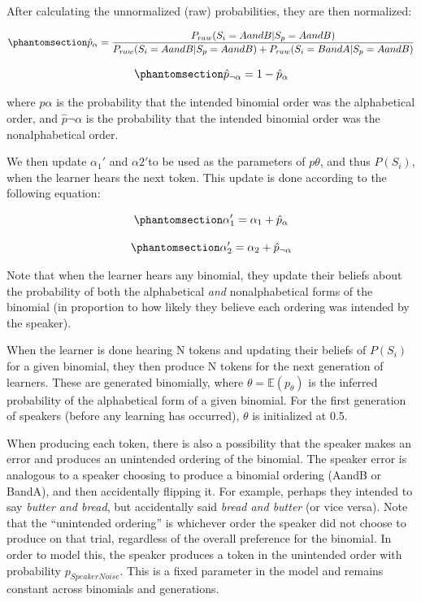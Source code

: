 \documentclass[
  12pt,
  letterpaper,
]{scrreprt}
\begin{document}
After calculating the unnormalized (raw) probabilities, they are then
normalized:

\begin{equation}\phantomsection\label{eq-phatalpha}{
\hat{p}_{\alpha} = \frac{P_{raw}(S_i = AandB|S_p = AandB)}{P_{raw}(S_i = AandB | S_p = AandB) + P_{raw}(S_i = BandA|S_p = AandB)}
}\end{equation}

\begin{equation}\phantomsection\label{eq-phatnotalpha}{
\hat{p}_{\neg\alpha} = 1 - \hat{p}_\alpha
}\end{equation}

\noindent where \(\hat{p}\alpha\) is the probability that the intended
binomial order was the alphabetical order, and \(\hat{p}{\neg\alpha}\)
is the probability that the intended binomial order was the
nonalphabetical order.

We then update \(\alpha_1'\) and \(\alpha2'\)to be used as the
parameters of \(p\theta\), and thus \(P(S_i)\), when the learner hears
the next token. This update is done according to the following equation:

\begin{equation}\phantomsection\label{eq-alpha1prime}{
\alpha_1' = \alpha_1 + \hat{p}_\alpha
}\end{equation}

\begin{equation}\phantomsection\label{eq-alpha2prime}{
\alpha_2' = \alpha_2 + \hat{p}_{\neg\alpha}
}\end{equation}

Note that when the learner hears any binomial, they update their beliefs
about the probability of both the alphabetical \emph{and}
nonalphabetical forms of the binomial (in proportion to how likely they
believe each ordering was intended by the speaker).

When the learner is done hearing N tokens and updating their beliefs of
\(P(S_i)\) for a given binomial, they then produce N tokens for the next
generation of learners. These are generated binomially, where
\(\theta = \mathbb{E}(p_\theta)\) is the inferred probability of the
alphabetical form of a given binomial. For the first generation of
speakers (before any learning has occurred), \(\theta\) is initialized
at 0.5.

When producing each token, there is also a possibility that the speaker
makes an error and produces an unintended ordering of the binomial. The
speaker error is analogous to a speaker choosing to produce a binomial
ordering (AandB or BandA), and then accidentally flipping it. For
example, perhaps they intended to say \emph{butter and bread}, but
accidentally said \emph{bread and butter} (or vice versa). Note that the
``unintended ordering'' is whichever order the speaker did not choose to
produce on that trial, regardless of the overall preference for the
binomial. In order to model this, the speaker produces a token in the
unintended order with probability \(p_{SpeakerNoise}\). This is a fixed
parameter in the model and remains constant across binomials and
generations.
\end{document}
